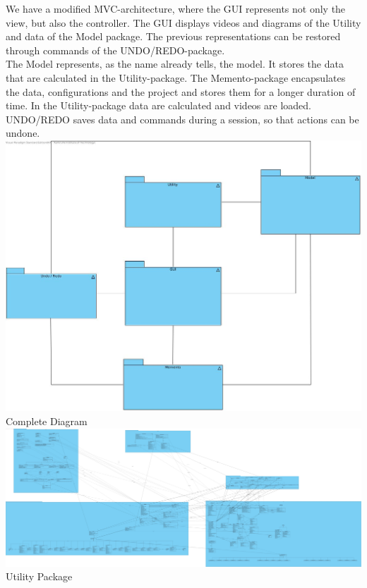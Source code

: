 \documentclass[twoside]{book}
\newcommand{\+}{\discretionary{\mbox{\scriptsize$\hookleftarrow$}}{}{}}
\begin{document}
We have a modified MVC-architecture, where the GUI represents not only the view, but also the controller. The GUI displays videos and diagrams of the Utility and data of the Model package.
The previous representations can be restored through commands of the UNDO/REDO-package.\\

The Model represents, as the name already tells, the model. It stores the data that are calculated in the Utility-package. 
The Memento-package encapsulates the data, configurations and the project and stores them for a longer duration of time. 
In the Utility-package data are calculated and videos are loaded.
UNDO/REDO saves data and commands during a session, so that actions can be undone.
\\
{\centering\includegraphics[width=1\textwidth]{Grobuebersicht.jpg}}
\newpage
Complete Diagram\\
{\centering\includegraphics[width=1\textwidth]{Alles.jpg}}
\newpage
Utility Package\\\\
\end{document}

